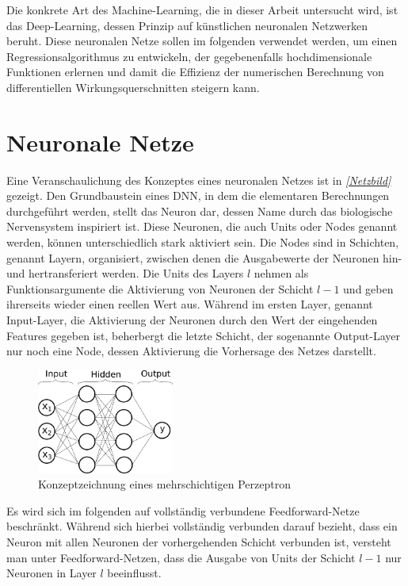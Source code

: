 Die konkrete Art des Machine-Learning, die in dieser Arbeit untersucht wird, ist das Deep-Learning, dessen Prinzip auf künstlichen neuronalen Netzwerken beruht. Diese neuronalen Netze sollen im folgenden verwendet werden, um einen Regressionsalgorithmus zu entwickeln, der gegebenenfalls hochdimensionale Funktionen erlernen und damit die Effizienz der numerischen Berechnung von differentiellen Wirkungsquerschnitten steigern kann. 
\section{Neuronale Netze}
Eine Veranschaulichung des Konzeptes eines neuronalen Netzes ist in \textit{\autoref{Netzbild}} gezeigt.
Den Grundbaustein eines DNN, in dem die elementaren Berechnungen durchgeführt werden, stellt das Neuron dar, dessen Name durch das biologische Nervensystem inspiriert ist.
Diese Neuronen, die auch Units oder Nodes genannt werden, können unterschiedlich stark aktiviert sein. Die Nodes sind in Schichten, genannt Layern, organisiert, zwischen denen die Ausgabewerte der Neuronen hin- und hertransferiert werden. Die Units des Layers $l$ nehmen als Funktionsargumente die Aktivierung von Neuronen der Schicht $l-1$ und geben ihrerseits wieder einen reellen Wert aus. Während im ersten Layer, genannt Input-Layer, die Aktivierung der Neuronen durch den Wert der eingehenden Features gegeben ist, beherbergt die letzte Schicht, der sogenannte Output-Layer nur noch eine Node, dessen Aktivierung die Vorhersage des Netzes darstellt. 

\begin{figure}
	\includegraphics[width=0.4\textwidth]{graphics/NeuralNetwork}
	\caption{Konzeptzeichnung eines mehrschichtigen Perzeptron\cite{Perceptron}}
	\label{Netzbild}
\end{figure}
Es wird sich im folgenden auf vollständig verbundene Feedforward-Netze beschränkt. Während sich hierbei vollständig verbunden darauf bezieht, dass ein Neuron mit allen Neuronen der vorhergehenden Schicht verbunden ist, versteht man unter Feedforward-Netzen, dass die Ausgabe von Units der Schicht $l-1$ nur Neuronen in Layer $l$ beeinflusst.

